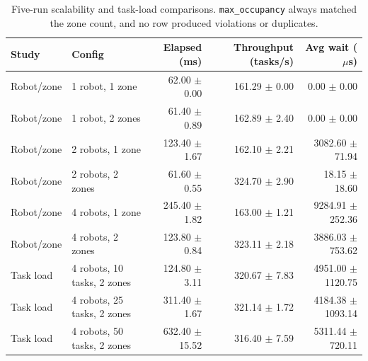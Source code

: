 \documentclass[11pt]{article}
\begin{document}
\begin{table}[H]
\centering
\small
\setlength{\tabcolsep}{5pt}
\begin{tabular}{llrrr}
\toprule
Study & Config & Elapsed (ms) & Throughput (tasks/s) & Avg wait (\(\mu\)s) \\
\midrule
Robot/zone & 1 robot, 1 zone & 62.00 \(\pm\) 0.00 & 161.29 \(\pm\) 0.00 & 0.00 \(\pm\) 0.00 \\
Robot/zone & 1 robot, 2 zones & 61.40 \(\pm\) 0.89 & 162.89 \(\pm\) 2.40 & 0.00 \(\pm\) 0.00 \\
Robot/zone & 2 robots, 1 zone & 123.40 \(\pm\) 1.67 & 162.10 \(\pm\) 2.21 & 3082.60 \(\pm\) 71.94 \\
Robot/zone & 2 robots, 2 zones & 61.60 \(\pm\) 0.55 & 324.70 \(\pm\) 2.90 & 18.15 \(\pm\) 18.60 \\
Robot/zone & 4 robots, 1 zone & 245.40 \(\pm\) 1.82 & 163.00 \(\pm\) 1.21 & 9284.91 \(\pm\) 252.36 \\
Robot/zone & 4 robots, 2 zones & 123.80 \(\pm\) 0.84 & 323.11 \(\pm\) 2.18 & 3886.03 \(\pm\) 753.62 \\
Task load & 4 robots, 10 tasks, 2 zones & 124.80 \(\pm\) 3.11 & 320.67 \(\pm\) 7.83 & 4951.00 \(\pm\) 1120.75 \\
Task load & 4 robots, 25 tasks, 2 zones & 311.40 \(\pm\) 1.67 & 321.14 \(\pm\) 1.72 & 4184.38 \(\pm\) 1093.14 \\
Task load & 4 robots, 50 tasks, 2 zones & 632.40 \(\pm\) 15.52 & 316.40 \(\pm\) 7.59 & 5311.44 \(\pm\) 720.11 \\
\bottomrule
\end{tabular}
\caption{Five-run scalability and task-load comparisons. \texttt{max\_occupancy} always matched the zone count, and no row produced violations or duplicates.}
\label{tab:scalability}
\end{table}
\end{document}
